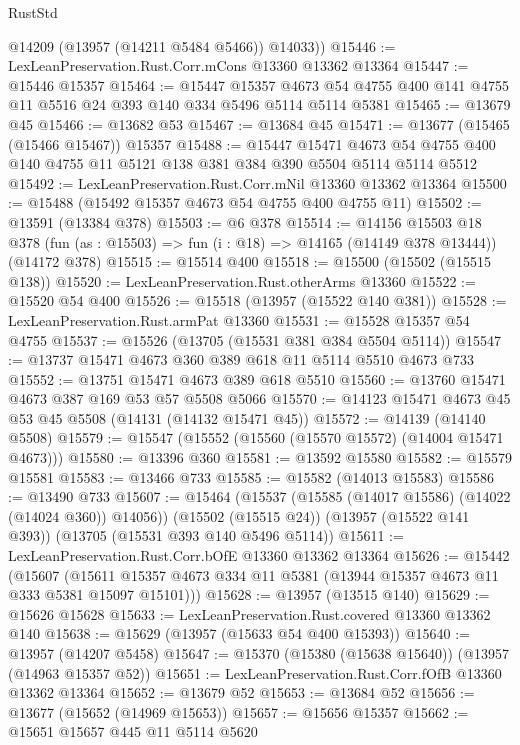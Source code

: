 \begin{lexlean}{RustStd}
\begin{coremodule}
        @14209
        (@13957 (@14211 @5484 @5466))
        @14033))
@15446 := LexLeanPreservation.Rust.Corr.mCons @13360 @13362 @13364
@15447 := @15446 @15357
@15464 := @15447
    @15357
    @4673
    @54
    @4755
    @400
    @141
    @4755
    @11
    @5516
    @24
    @393
    @140
    @334
    @5496
    @5114
    @5114
    @5381
@15465 := @13679 @45
@15466 := @13682 @53
@15467 := @13684 @45
@15471 := @13677 (@15465 (@15466 @15467)) @15357
@15488 := @15447
    @15471
    @4673
    @54
    @4755
    @400
    @140
    @4755
    @11
    @5121
    @138
    @381
    @384
    @390
    @5504
    @5114
    @5114
    @5512
@15492 := LexLeanPreservation.Rust.Corr.mNil @13360 @13362 @13364
@15500 := @15488 (@15492 @15357 @4673 @54 @4755 @400 @4755 @11)
@15502 := @13591 (@13384 @378)
@15503 := @6 @378
@15514 := @14156
    @15503
    @18
    @378
    (fun (as : @15503) => fun (i : @18) => @14165 (@14149 @378 @13444))
    (@14172 @378)
@15515 := @15514 @400
@15518 := @15500 (@15502 (@15515 @138))
@15520 := LexLeanPreservation.Rust.otherArms @13360
@15522 := @15520 @54 @400
@15526 := @15518 (@13957 (@15522 @140 @381))
@15528 := LexLeanPreservation.Rust.armPat @13360
@15531 := @15528 @15357 @54 @4755
@15537 := @15526 (@13705 (@15531 @381 @384 @5504 @5114))
@15547 := @13737 @15471 @4673 @360 @389 @618 @11 @5114 @5510 @4673 @733
@15552 := @13751 @15471 @4673 @389 @618 @5510
@15560 := @13760 @15471 @4673 @387 @169 @53 @57 @5508 @5066
@15570 := @14123 @15471 @4673 @45 @53 @45 @5508 (@14131 (@14132 @15471 @45))
@15572 := @14139 (@14140 @5508)
@15579 := @15547 (@15552 (@15560 (@15570 @15572) (@14004 @15471 @4673)))
@15580 := @13396 @360
@15581 := @13592 @15580
@15582 := @15579 @15581
@15583 := @13466 @733
@15585 := @15582 (@14013 @15583)
@15586 := @13490 @733
@15607 := @15464
    (@15537 (@15585 (@14017 @15586) (@14022 (@14024 @360)) @14056))
    (@15502 (@15515 @24))
    (@13957 (@15522 @141 @393))
    (@13705 (@15531 @393 @140 @5496 @5114))
@15611 := LexLeanPreservation.Rust.Corr.bOfE @13360 @13362 @13364
@15626 := @15442
    (@15607 (@15611 @15357 @4673 @334 @11 @5381 (@13944 @15357 @4673 @11 @333 @5381 @15097 @15101)))
@15628 := @13957 (@13515 @140)
@15629 := @15626 @15628
@15633 := LexLeanPreservation.Rust.covered @13360 @13362 @140
@15638 := @15629 (@13957 (@15633 @54 @400 @15393))
@15640 := @13957 (@14207 @5458)
@15647 := @15370 (@15380 (@15638 @15640)) (@13957 (@14963 @15357 @52))
@15651 := LexLeanPreservation.Rust.Corr.fOfB @13360 @13362 @13364
@15652 := @13679 @52
@15653 := @13684 @52
@15656 := @13677 (@15652 (@14969 @15653))
@15657 := @15656 @15357
@15662 := @15651 @15657 @445 @11 @5114 @5620

\end{coremodule}
\end{lexlean}
